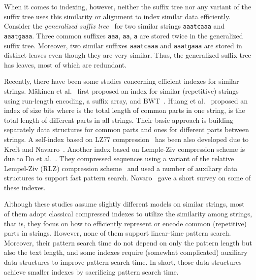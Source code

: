\documentclass{llncs}
\newcommand{\partitle}[1]{}                        \newcommand{\commentout}[1]{}
\begin{document}
When it comes to indexing, however,
 neither the suffix tree nor any variant of the suffix tree
 uses this similarity or alignment to index similar data efficiently.
Consider the {\em generalized suffix tree}~\cite{Amir&Farach:94,Gusfield:97}
 for two similar strings  {\tt aaatcaaa} and  {\tt aaatgaaa}.
Three common suffixes {\tt aaa}, {\tt aa}, {\tt a}
 are stored twice in the generalized suffix tree.
Moreover, two similar suffixes {\tt aaatcaaa} and {\tt aaatgaaa}
 are stored in distinct leaves
 even though they are very similar.
Thus, the generalized suffix tree has  leaves, most of which are redundant.


\partitle{Previous works}

Recently, there have been some studies concerning efficient indexes for similar strings.
M\"{a}kinen et al.~\cite{recomb/MakinenNSV09,jcb/MakinenNSV10}
 first proposed an index for similar (repetitive) strings
 using run-length encoding, a suffix array, and BWT~\cite{Burrows&Wheeler:94}.
Huang et al.~\cite{aaim/HuangLSTY10} proposed an index of size  bits
 where  is the total length of common parts in one string,
  is the total length of different parts in all strings.
Their basic approach is building separately data structures for common parts
 and ones for different parts between strings.
A self-index based on LZ77 compression~\cite{Ziv&Lempel:77}
 has been also developed due to Kreft and Navarro~\cite{Kreft&Navarro:XX}.
Another index based on Lemple-Ziv compression scheme is
 due to Do et al.~\cite{aaim/DoJSS12}.
They compressed sequences using a variant of the relative Lempel-Ziv (RLZ) compression
 scheme~\cite{spire/KuruppuPZ10}
 and used a number of auxiliary data structures to support fast pattern search.
Navaro~\cite{iwoca/Navarro12} gave a short survey on some of these indexes.


\partitle{Motivation}

Although these studies assume slightly different models on similar strings,
 most of them adopt classical compressed indexes to utilize the similarity among strings,
 that is, they focus on how to efficiently represent or encode common (repetitive) parts in strings.
However, none of them support linear-time pattern search.
Moreover, their pattern search time do not depend on only the pattern length
 but also the text length,
 and some indexes require (somewhat complicated) auxiliary data structures
 to improve pattern search time.
In short, those data structures achieve smaller indexes
by sacrificing pattern search time.
\end{document}
